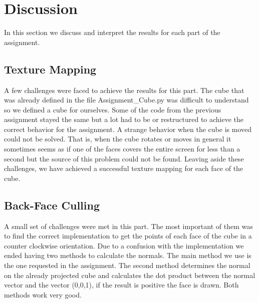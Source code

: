 \section{Discussion}
	In this section we discuss and interpret the results for each part of the assignment.
\subsection{Texture Mapping}
A few challenges were faced to achieve the results for this part. The cube that was already defined in the file Assignment\_Cube.py was difficult to understand so we defined a cube for ourselves. Some of the code from the previous assignment stayed the same but a lot had to be or restructured to achieve the correct behavior for the assignment. A strange behavior when the cube is moved could not be solved. That is, when the cube rotates or moves in general it sometimes seems as if one of the faces covers the entire screen for less than a second but the source of this problem could not be found. Leaving aside these challenges, we have achieved a successful texture mapping for each face of the cube.

\subsection{Back-Face Culling}
A small set of challenges were met in this part. The most important of them was to find the correct implementation to get the points of each face of the cube in a counter clockwise orientation. Due to a confusion with the implementation we ended having two methods to calculate the normals. The main method we use is the one requested in the assignment. The second method determines the normal on the already projected cube and calculates the dot product between the normal vector and the vector (0,0,1), if the result is positive the face is drawn. Both methods work very good.

